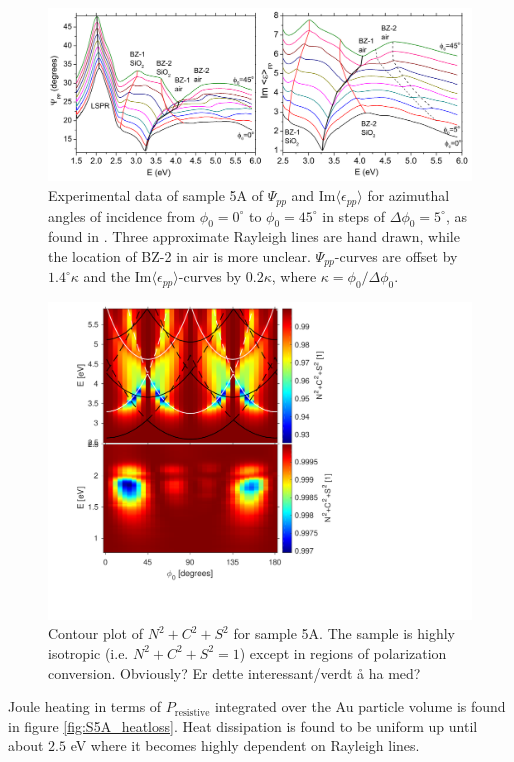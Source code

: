 \begin{figure}[h!]  %
    \centering
    \includegraphics[width=\linewidth]{figures/ch4/S5A/expdata/S5A_Psi_Imeps_stackedphi.png}
    \caption{Experimental data of sample 5A of $\Psi_{pp}$ and Im$\langle\epsilon_{pp}\rangle$ for azimuthal angles of incidence from $\phi_0=0^\circ$ to $\phi_0=45^\circ$ in steps of $\Delta\phi_0=5^\circ$, as found in \cite{Brakstad:15}. Three approximate Rayleigh lines are hand drawn, while the location of BZ-2 in air is more unclear. $\Psi_{pp}$-curves are offset by $1.4^\circ\kappa$ and the Im$\langle\epsilon_{pp}\rangle$-curves by $0.2\kappa$, where $\kappa=\phi_0/\Delta\phi_0$. }
    \label{fig:S5A_stacked_PsippImeps_exp}
\end{figure}

\begin{figure}[h!]  %
    \centering
    \includegraphics[width=0.5\linewidth, trim=1.1cm  1.8cm 6.5cm 0cm, clip]{figures/ch4/S5A/NCS/S5A_sumNCSsquared_contour.pdf}
    \caption{Contour plot of $N^2+C^2+S^2$ for sample 5A. The sample is highly isotropic (i.e. $N^2+C^2+S^2=1$) except in regions of polarization conversion. \color{red}Obviously? Er dette interessant/verdt å ha med?}
    \label{fig:S5A_sumNCSsquared}
\end{figure}

Joule heating in terms of $P_{\text{resistive}}$ integrated over the Au particle volume is found in figure \ref{fig:S5A_heatloss}. Heat dissipation is found to be uniform up until about $2.5$ eV where it becomes highly dependent on Rayleigh lines. %

